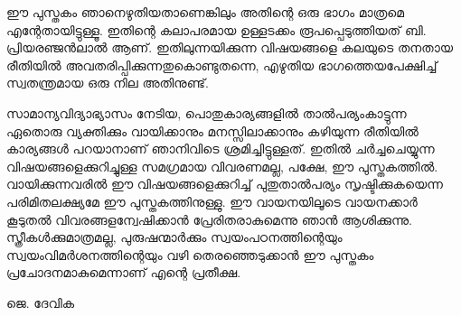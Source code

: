 ഈ പുസ്തകം ഞാനെഴുതിയതാണെങ്കിലും അതിന്റെ ഒരു ഭാഗം മാത്രമെ എന്റേതായിട്ടുള്ളൂ. ഇതിന്റെ കലാപരമായ ഉള്ളടക്കം രൂപപ്പെടുത്തിയത് ബി. പ്രിയരഞ്ജൻലാൽ ആണ്. ഇതിലുന്നയിക്കുന്ന വിഷയങ്ങളെ കലയുടെ തനതായ രീതിയിൽ അവതരിപ്പിക്കുന്നതുകൊണ്ടുതന്നെ, എഴുതിയ ഭാഗത്തെയപേക്ഷിച്ച് സ്വതന്ത്രമായ ഒരു നില അതിനുണ്ട്.


സാമാന്യവിദ്യാഭ്യാസം നേടിയ, പൊതുകാര്യങ്ങളിൽ താൽപര്യംകാട്ടുന്ന ഏതൊരു വ്യക്തിക്കും വായിക്കാനും മനസ്സിലാക്കാനും കഴിയുന്ന രീതിയിൽ കാര്യങ്ങൾ പറയാനാണ് ഞാനിവിടെ ശ്രമിച്ചിട്ടുള്ളത്. ഇതിൽ ചർച്ചചെയ്യുന്ന വിഷയങ്ങളെക്കുറിച്ചുള്ള സമഗ്രമായ വിവരണമല്ല, പക്ഷേ, ഈ പുസ്തകത്തിൽ. വായിക്കുന്നവരിൽ ഈ വിഷയങ്ങളെക്കുറിച്ച് പുതുതാൽപര്യം സൃഷ്ടിക്കുകയെന്ന പരിമിതലക്ഷ്യമേ ഈ പുസ്തകത്തിനുള്ളു. ഈ വായനയിലൂടെ വായനക്കാർ കൂടുതൽ വിവരങ്ങളന്വേഷിക്കാൻ പ്രേരിതരാകുമെന്നു ഞാൻ ആശിക്കുന്നു. സ്ത്രീകൾക്കുമാത്രമല്ല, പുരുഷന്മാർക്കും സ്വയംപഠനത്തിന്റെയും സ്വയംവിമർശനത്തിന്റെയും വഴി തെരഞ്ഞെടുക്കാൻ ഈ പുസ്തകം പ്രചോദനമാകുമെന്നാണ് എന്റെ പ്രതീക്ഷ.
\begin{flushright}
{ജെ. ദേവിക}
\end{flushright}
